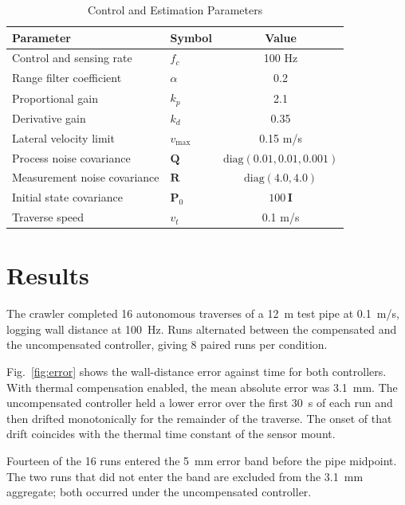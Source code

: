 \begin{table}[t]
\centering
\caption{Control and Estimation Parameters}
\label{tab:params}
\small
\setlength{\tabcolsep}{4pt}
\begin{tabular}{llc}
\hline
Parameter & Symbol & Value \\
\hline
Control and sensing rate & $f_c$ & 100 Hz \\
Range filter coefficient & $\alpha$ & 0.2 \\
Proportional gain & $k_p$ & 2.1 \\
Derivative gain & $k_d$ & 0.35 \\
Lateral velocity limit & $v_{\max}$ & 0.15 m/s \\
Process noise covariance & $\mathbf{Q}$ & $\mathrm{diag}(0.01, 0.01, 0.001)$ \\
Measurement noise covariance & $\mathbf{R}$ & $\mathrm{diag}(4.0, 4.0)$ \\
Initial state covariance & $\mathbf{P}_0$ & $100\,\mathbf{I}$ \\
Traverse speed & $v_t$ & 0.1 m/s \\
\hline
\end{tabular}
\end{table}

\section{Results}

The crawler completed 16 autonomous traverses of a 12~m test pipe at 0.1~m/s, logging
wall distance at 100~Hz. Runs alternated between the compensated and the uncompensated
controller, giving 8 paired runs per condition.

Fig.~\ref{fig:error} shows the wall-distance error against time for both controllers.
With thermal compensation enabled, the mean absolute error was 3.1~mm. The
uncompensated controller held a lower error over the first 30~s of each run and then
drifted monotonically for the remainder of the traverse. The onset of that drift
coincides with the thermal time constant of the sensor mount.

Fourteen of the 16 runs entered the 5~mm error band before the pipe midpoint. The two
runs that did not enter the band are excluded from the 3.1~mm aggregate; both occurred
under the uncompensated controller.

